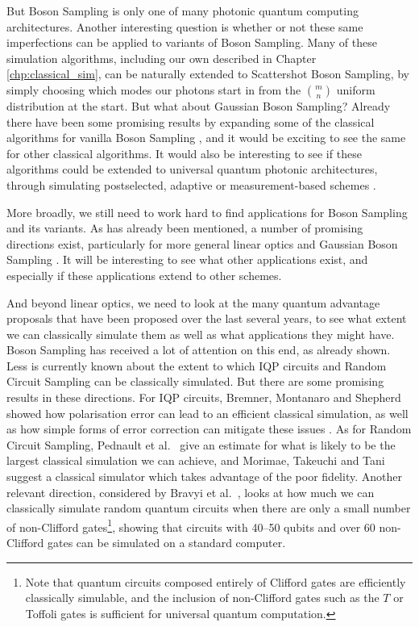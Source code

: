 But Boson Sampling is only one of many photonic quantum computing architectures. Another interesting question is whether or not these same imperfections can be applied to variants of Boson Sampling. Many of these simulation algorithms, including our own described in Chapter \ref{chp:classical_sim}, can be naturally extended to Scattershot Boson Sampling, by simply choosing which modes our photons start in from the $\binom{m}{n}$ uniform distribution at the start. But what about Gaussian Boson Sampling? Already there have been some promising results by expanding some of the classical algorithms for vanilla Boson Sampling \cite{qi2019, quesada2019, wu2019, renema2019}, and it would be exciting to see the same for other classical algorithms. It would also be interesting to see if these algorithms could be extended to universal quantum photonic architectures, through simulating postselected, adaptive or measurement-based schemes \cite{knill2001, gimenosegovia2015}.

More broadly, we still need to work hard to find applications for Boson Sampling and its variants. As has already been mentioned, a number of promising directions exist, particularly for more general linear optics \cite{sparrow2018} and Gaussian Boson Sampling \cite{huh2015, bradler2018, schuld2019}. It will be interesting to see what other applications exist, and especially if these applications extend to other schemes.

And beyond linear optics, we need to look at the many quantum advantage proposals that have been proposed over the last several years, to see what extent we can classically simulate them as well as what applications they might have. Boson Sampling has received a lot of attention on this end, as already shown. Less is currently known about the extent to which IQP circuits and Random Circuit Sampling can be classically simulated. But there are some promising results in these directions. For IQP circuits, Bremner, Montanaro and Shepherd showed how polarisation error can lead to an efficient classical simulation, as well as how simple forms of error correction can mitigate these issues \cite{bremner2017}. As for Random Circuit Sampling, Pednault et al.~\cite{pednault2019} give an estimate for what is likely to be the largest classical simulation we can achieve, and Morimae, Takeuchi and Tani \cite{morimae2019google} suggest a classical simulator which takes advantage of the poor fidelity. Another relevant direction, considered by Bravyi et al.~\cite{bravyi2019}, looks at how much we can classically simulate random quantum circuits when there are only a small number of non-Clifford gates\footnote{Note that quantum circuits composed entirely of Clifford gates are efficiently classically simulable, and the inclusion of non-Clifford gates such as the $T$ or Toffoli gates is sufficient for universal quantum computation.}, showing that circuits with 40--50 qubits and over 60 non-Clifford gates can be simulated on a standard computer.

